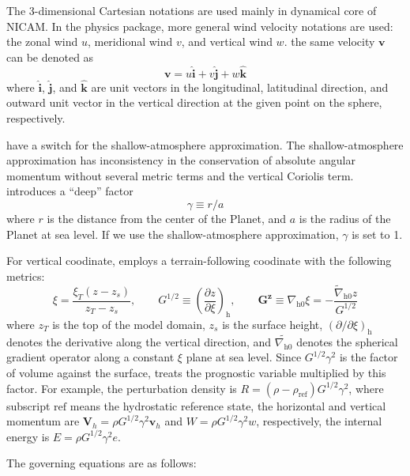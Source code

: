 The 3-dimensional Cartesian notations are used mainly in dynamical core of NICAM.
In the physics package, more general wind velocity notations are used:
the zonal wind $u$, meridional wind $v$, and vertical wind $w$.
the same velocity $\bm{v}$ can be denoted as
\begin{equation}
 \bm{v} = u \bm{\hat{i}}  + v \bm{\hat{j}} + w \bm{\hat{k}}
\end{equation}
where $\bm{\hat{i}}$, $\bm{\hat{j}}$, and $\bm{\hat{k}}$ are unit vectors in the
longitudinal, latitudinal direction, and outward unit vector in the
vertical direction at the given point on the sphere, respectively.

%
%
\NICAM have a switch for the shallow-atmosphere approximation.
The shallow-atmosphere approximation has inconsistency in the conservation of absolute angular momentum
without several metric terms and the vertical Coriolis term.
%
\NICAM introduces a ``deep'' factor
%
\begin{equation}
 \gamma \equiv r/a
\end{equation}
%
where $r$ is the distance from the center of the Planet,
and $a$ is the radius of the Planet at sea level.
If we use the shallow-atmosphere approximation, $\gamma$ is set to 1.

For vertical coodinate, \NICAM employs a terrain-following coodinate with
the following metrics:
%
\begin{equation}
 \xi = \frac{\xi_T(z-z_s)}{z_T - z_s}, \qquad
  G^{1/2} \equiv (\frac{\partial z}{\partial \xi})_\text{h},  \qquad
  \bm{G^{z}} \equiv \nabla_\text{h0} \xi = -\frac{\tilde{\nabla}_\text{h0} z}{G^{1/2}}
\end{equation}
%
where $z_T$ is the top of the model domain, $z_s$ is the surface height,
$(\partial/\partial \xi)_\text{h}$ denotes the derivative along the vertical
direction,
and $\tilde{\nabla_\text{h0}}$ denotes the spherical gradient operator along
a constant $\xi$ plane at sea level.
Since $G^{1/2}\gamma^{2}$ is the factor of volume against the surface,
\NICAM treats the prognostic variable multiplied by this factor.
%
For example, the perturbation density is
$R = (\rho-\rho_\text{ref})G^{1/2}\gamma^2 $, %
where subscript $\text{ref}$ means the hydrostatic reference state,
the horizontal and vertical momentum are
$\bm{V}_h = \rho G^{1/2}\gamma^2 \bm{v}_h$ and
$W = \rho G^{1/2}\gamma^2 w$, respectively,
the internal energy is
$E = \rho G^{1/2}\gamma^2 e$.

The governing equations are as follows:

